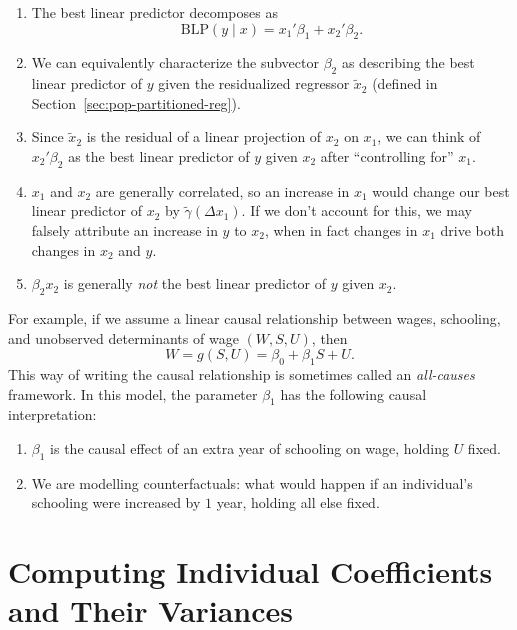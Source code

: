 \begin{remark}[Summary]
	\begin{enumerate}[label=(\roman*)]
		\item The best linear predictor decomposes as
		      \[\mathrm{BLP}(y\mid x)=x_1'\beta_1 + x_2'\beta_2.\]
		\item We can equivalently characterize the subvector $\beta_2$ as describing the best linear predictor of $y$ given the residualized regressor $\tilde{x}_2$ (defined in Section~\ref{sec:pop-partitioned-reg}).
		\item Since $\tilde{x}_2$ is the residual of a linear projection of $x_2$ on $x_1$, we can think of $x_2'\beta_2$ as the best linear predictor of $y$ given $x_2$ after ``controlling for'' $x_1$.
		\item $x_1$ and $x_2$ are generally correlated, so an increase in $x_1$ would change our best linear predictor of $x_2$ by $\tilde{\gamma}(\Delta x_1)$. If we don't account for this, we may falsely attribute an increase in $y$ to $x_2$, when in fact changes in $x_1$ drive both changes in $x_2$ and $y$.
		\item $\beta_2 x_2$ is generally \emph{not} the best linear predictor of $y$ given $x_2$.
	\end{enumerate}
\end{remark}

\begin{example}
	For example, if we assume a linear causal relationship between wages, schooling, and unobserved determinants of wage $(W,S,U)$, then
	\[
		W = g(S,U) = \beta_0 + \beta_1 S + U.
	\]
	This way of writing the causal relationship is sometimes called an \emph{all-causes} framework.
	In this model, the parameter $\beta_1$ has the following causal interpretation:
	\begin{enumerate}[label=(\roman*)]
		\item $\beta_1$ is the causal effect of an extra year of schooling on wage, holding $U$ fixed.
		\item We are modelling counterfactuals: what would happen if an individual's schooling were increased by $1$ year, holding all else fixed.
	\end{enumerate}
\end{example}


\section{Computing Individual Coefficients and Their Variances}

